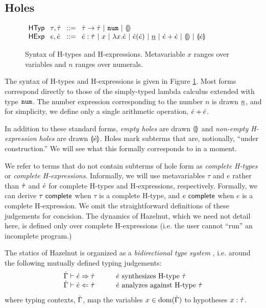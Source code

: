 \documentclass{llncs}
\begin{document}
\subsection{Holes}\label{sec:holes}
\begin{figure}
$\arraycolsep=4pt\begin{array}{lllllll}
\mathsf{HTyp} & \tau,\htau & ::= &
  \tarr{\htau}{\htau} ~\vert~
  \tnum ~\vert~
  \tehole\\
\mathsf{HExp} & e,\hexp & ::= &
  \hexp : \htau ~\vert~
  x ~\vert~
  \hlam{x}{\hexp} ~\vert~
  \hap{\hexp}{\hexp} ~\vert~
  \hnum{n} ~\vert~
  \hadd{\hexp}{\hexp} ~\vert~
  \hehole ~\vert~
  \hhole{\hexp}
\end{array}$
\caption{Syntax of H-types and H-expressions. Metavariable $x$ ranges over variables and $n$ ranges over numerals.}
\label{fig:hexp-syntax}
\end{figure}

The syntax of H-types and H-expressions is given in Figure \ref{fig:hexp-syntax}. Most forms correspond directly to those of the simply-typed lambda calculus extended with type $\texttt{num}$. The number expression corresponding to the number $n$ is drawn $\underline{n}$, and for simplicity, we define only a single arithmetic operation, $\dot{e} + \dot{e}$.

In addition to these standard forms, \emph{empty holes} are drawn $\llparenthesis\rrparenthesis$ and \emph{non-empty H-expression holes} are drawn $\llparenthesis\dot{e}\rrparenthesis$. Holes mark subterms that are, notionally, ``under construction.'' We will see what this formally corresponds to in a moment.

We refer to terms that do not contain subterms of hole form as \emph{complete H-types} or \emph{complete H-expressions}. Informally, we will use metavariables $\tau$ and $e$ rather than $\dot{\tau}$ and $\dot{e}$ for complete H-types and H-expressions, respectively. Formally, we can derive $\tau~\mathsf{complete}$ when $\tau$ is a complete H-type, and $e~\mathsf{complete}$ when $e$ is a complete H-expression. We omit the straightforward definitions of these judgements for concision. The dynamics of Hazelnut, which we need not detail here, is defined only  over complete H-expressions (i.e. the user cannot ``run'' an incomplete program.)

The statics of Hazelnut is organized as a \emph{bidirectional type system} \cite{Pierce:2000:LTI:345099.345100}, i.e. around the following mutually defined typing judgements:
\[\arraycolsep=15pt\begin{array}{ll}
\hsyn{\hGamma}{\hexp}{\htau} & \text{$\hexp$ synthesizes H-type $\htau$}\\
\hana{\hGamma}{\hexp}{\htau} & \text{$\hexp$ analyzes against H-type $\htau$}
\end{array}\]
where typing contexts, $\dot{\Gamma}$, map the variables $x \in \text{dom}(\dot{\Gamma})$ to hypotheses $x : \dot{\tau}$.
\end{document}
